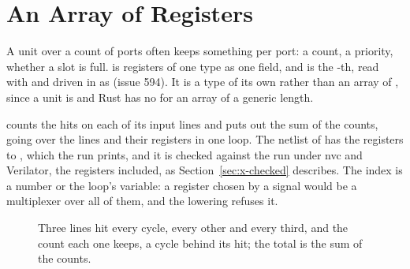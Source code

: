 \section{An Array of Registers}
\label{sec:x-regs}

A unit over a count of ports often keeps something per port: a count,
a priority, whether a slot is full.  is 
registers of one type as one field, and  is the
-th, read with  and driven in  as
 (issue 594). It is a type of its own rather than
an array of , since a unit is  and Rust has no
 for an array of a generic length.

 counts the hits on each of its input lines and puts
out the sum of the counts, going over the lines and their registers
in one loop. The netlist of  has the registers
 to , which the run prints, and it is
checked against the run under nvc and Verilator, the registers
included, as Section~\ref{sec:x-checked} describes. The index is a
number or the loop's variable: a register chosen by a signal would be
a multiplexer over all of them, and the lowering refuses it.

\begin{figure}[htbp]
\centering

\caption{Three lines hit every cycle, every other and every third,
and the count each one keeps, a cycle behind its hit; the total is
the sum of the counts.}
\label{fig:x-regs}
\end{figure}




